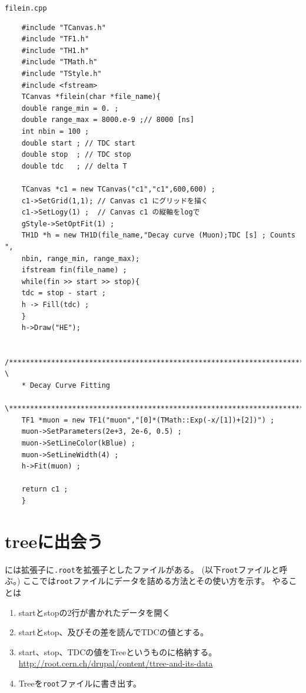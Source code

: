 \documentclass{jarticle}
\begin{document}
 \begin{itembox}{\texttt{filein.cpp}}
\begin{verbatim}
	#include "TCanvas.h"
	#include "TF1.h"
	#include "TH1.h"
	#include "TMath.h"
	#include "TStyle.h"
	#include <fstream>
	TCanvas *filein(char *file_name){
	double range_min = 0. ;
	double range_max = 8000.e-9 ;// 8000 [ns]
	int nbin = 100 ;  
	double start ; // TDC start
	double stop  ; // TDC stop
	double tdc   ; // delta T

	TCanvas *c1 = new TCanvas("c1","c1",600,600) ;
	c1->SetGrid(1,1); // Canvas c1 にグリッドを描く
	c1->SetLogy(1) ;  // Canvas c1 の縦軸をlogで
	gStyle->SetOptFit(1) ;
	TH1D *h = new TH1D(file_name,"Decay curve (Muon);TDC [s] ; Counts ",
	nbin, range_min, range_max);
	ifstream fin(file_name) ;
	while(fin >> start >> stop){
	tdc = stop - start ;
	h -> Fill(tdc) ;
	}
	h->Draw("HE");

	/******************************************************************************** \
	* Decay Curve Fitting
	\********************************************************************************/
	TF1 *muon = new TF1("muon","[0]*(TMath::Exp(-x/[1])+[2])") ;
	muon->SetParameters(2e+3, 2e-6, 0.5) ;
	muon->SetLineColor(kBlue) ;
	muon->SetLineWidth(4) ;
	h->Fit(muon) ;

	return c1 ;
	}
\end{verbatim}
 \end{itembox}


 \clearpage
 \section{treeに出会う}

 \ROOT には拡張子に\verb|.root|を拡張子としたファイルがある。
 (以下\verb|root|ファイルと呼ぶ。)
 ここでは\verb|root|ファイルにデータを詰める方法とその使い方を示す。
 やることは
 \begin{enumerate}
  \item startとstopの2行が書かれたデータを開く
  \item startとstop、及びその差を読んでTDCの値とする。
  \item start、stop、TDCの値をTreeというものに格納する。\\
	\url{http://root.cern.ch/drupal/content/ttree-and-its-data}
  \item Treeを\verb|root|ファイルに書き出す。
 \end{enumerate}
\end{document}
